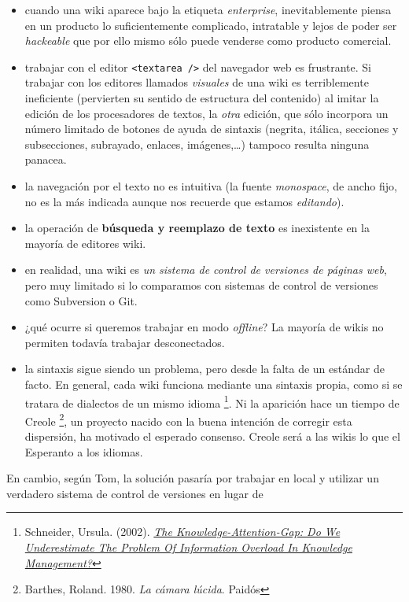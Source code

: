 \documentclass[12pt, a4paper,twoside]{book}
\begin{document}
\begin{itemize}
\item
  cuando una wiki aparece bajo la etiqueta \emph{enterprise},
  inevitablemente piensa en un producto lo suficientemente
  complicado, intratable y lejos de poder ser \emph{hackeable} que
  por ello mismo sólo puede venderse como producto comercial.
\item
  trabajar con el editor \verb!<textarea />! del navegador web es
  frustrante. Si trabajar con los editores llamados \emph{visuales}
  de una wiki es terriblemente ineficiente (pervierten su sentido de
  estructura del contenido) al imitar la edición de los procesadores
  de textos, la \emph{otra} edición, que sólo incorpora un número
  limitado de botones de ayuda de sintaxis (negrita, itálica,
  secciones y subsecciones, subrayado, enlaces, imágenes,\ldots{})
  tampoco resulta ninguna panacea.
\item
  la navegación por el texto no es intuitiva (la fuente
  \emph{monospace}, de ancho fijo, no es la más indicada aunque nos
  recuerde que estamos \emph{editando}).
\item
  la operación de \textbf{búsqueda y reemplazo de texto} es
  inexistente en la mayoría de editores wiki.
\item
  en realidad, una wiki es
  \emph{un sistema de control de versiones de páginas web}, pero muy
  limitado si lo comparamos con sistemas de control de versiones como
  Subversion o Git.
\item
  ¿qué ocurre si queremos trabajar en modo \emph{offline}? La mayoría
  de wikis no permiten todavía trabajar desconectados.
\item
  la sintaxis sigue siendo un problema, pero desde la falta de un
  estándar de facto. En general, cada wiki funciona mediante una
  sintaxis propia, como si se tratara de dialectos de un mismo
  idioma%
  \footnote{Schneider, Ursula. (2002).
\emph{\href{http://www.jucs.org/jucs_8_5/the_knowledge_attention_gap/Schneider_U.html}{The Knowledge-Attention-Gap: Do We Underestimate The Problem Of Information Overload In Knowledge Management?}}}.
  Ni la aparición hace un tiempo de Creole%
  \footnote{Barthes, Roland. 1980. \emph{La cámara lúcida}. Paidós},
  un proyecto nacido con la buena intención de corregir esta
  dispersión, ha motivado el esperado consenso. Creole será a las
  wikis lo que el Esperanto a los idiomas.
\end{itemize}
En cambio, según Tom, la solución pasaría por trabajar en local y
utilizar un verdadero sistema de control de versiones en lugar de
\end{document}
